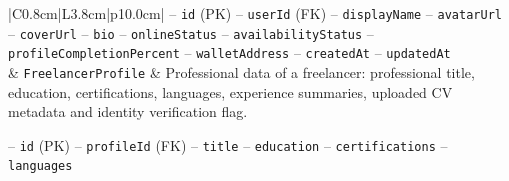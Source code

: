 \begin{center}
\begin{longtable}{|C{0.8cm}|L{3.8cm}|p{10.0cm}|}
\hspace*{1em}-- \texttt{id} (PK) \newline
\hspace*{1em}-- \texttt{user\allowbreak Id} (FK) \newline
\hspace*{1em}-- \texttt{display\allowbreak Name} \newline
\hspace*{1em}-- \texttt{avatar\allowbreak Url} \newline
\hspace*{1em}-- \texttt{cover\allowbreak Url} \newline
\hspace*{1em}-- \texttt{bio} \newline
\hspace*{1em}-- \texttt{online\allowbreak Status} \newline
\hspace*{1em}-- \texttt{availability\allowbreak Status} \newline
\hspace*{1em}-- \texttt{profile\allowbreak Completion\allowbreak Percent} \newline
\hspace*{1em}-- \texttt{wallet\allowbreak Address} \newline
\hspace*{1em}-- \texttt{created\allowbreak At} \newline
\hspace*{1em}-- \texttt{updated\allowbreak At} \\
 & \texttt{Freelancer\allowbreak Profile} & Professional data of a freelancer: professional title, education, certifications, languages, experience summaries, uploaded CV metadata and identity verification flag.\par\smallskip
\hspace*{1em}-- \texttt{id} (PK) \newline
\hspace*{1em}-- \texttt{profile\allowbreak Id} (FK) \newline
\hspace*{1em}-- \texttt{title} \newline
\hspace*{1em}-- \texttt{education} \newline
\hspace*{1em}-- \texttt{certifications} \newline
\hspace*{1em}-- \texttt{languages} \newline

\end{longtable}
\end{center}
